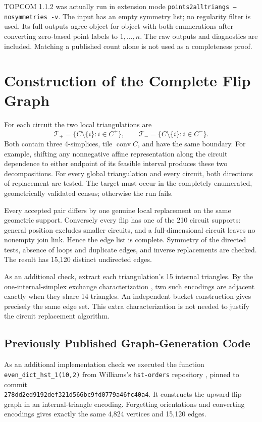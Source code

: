 \documentclass[11pt]{article}
\newcommand{\conv}{\operatorname{conv}}
\begin{document}
TOPCOM 1.1.2 was actually run in extension mode
\texttt{points2alltriangs --nosymmetries -v}. The input has an empty symmetry
list; no regularity filter is used. Its full outputs agree object for object
with both enumerations after converting zero-based point labels to $1,\ldots,n$.
The raw outputs and diagnostics are included. Matching a published count alone
is not used as a completeness proof.

\section{Construction of the Complete Flip Graph}
For each circuit the two local triangulations are
\[
\mathcal T_+=\{C\setminus\{i\}:i\in C^+\},\qquad
\mathcal T_-=\{C\setminus\{i\}:i\in C^-\}.
\]
Both contain three 4-simplices, tile $\conv C$, and have the same boundary.
For example, shifting any nonnegative affine representation along the circuit
dependence to either endpoint of its feasible interval produces these two
decompositions. For every global triangulation and every circuit, both
directions of replacement are tested. The target must occur in the completely
enumerated, geometrically validated census; otherwise the run fails.

Every accepted pair differs by one genuine local replacement on the same
geometric support. Conversely every flip has one of the 210 circuit supports:
general position excludes smaller circuits, and a full-dimensional circuit
leaves no nonempty join link. Hence the edge list is complete. Symmetry of the
directed tests, absence of loops and duplicate edges, and inverse replacements
are checked. The result has 15,120 distinct undirected edges.

As an additional check, extract each triangulation's 15 internal triangles.
By the one-internal-simplex exchange characterization
\cite[Theorems 1.2--1.3]{williams}, two such encodings are adjacent exactly when
they share 14 triangles. An independent bucket construction gives precisely
the same edge set. This extra characterization is not needed to justify the
circuit replacement algorithm.

\subsection{Previously Published Graph-Generation Code}
As an additional implementation check we executed the function
\texttt{even\_dict\_hst\_1(10,2)} from Williams's \texttt{hst-orders}
repository \cite{williamscode}, pinned to commit\\
{\small\texttt{278dd2ed9192def321d566bc9fd0779a46fc40a4}}.
It constructs the upward-flip graph in an internal-triangle encoding.
Forgetting orientations and converting encodings gives exactly the same
4,824 vertices and 15,120 edges.
\end{document}
